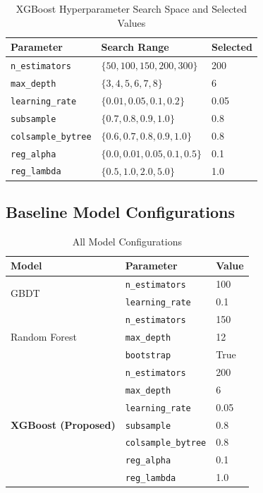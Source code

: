 \documentclass[10pt, journal, letterpaper]{IEEEtran}
\begin{document}
\begin{table}[htbp]
\caption{XGBoost Hyperparameter Search Space and Selected Values}
\label{tab:hpsearch}
\centering\small
\begin{tabular}{lll}
\toprule
\textbf{Parameter} & \textbf{Search Range} & \textbf{Selected} \\
\midrule
\texttt{n\_estimators}     & $\{50,100,150,200,300\}$     & 200  \\
\texttt{max\_depth}        & $\{3,4,5,6,7,8\}$           & 6    \\
\texttt{learning\_rate}    & $\{0.01,0.05,0.1,0.2\}$     & 0.05 \\
\texttt{subsample}         & $\{0.7,0.8,0.9,1.0\}$       & 0.8  \\
\texttt{colsample\_bytree} & $\{0.6,0.7,0.8,0.9,1.0\}$  & 0.8  \\
\texttt{reg\_alpha}        & $\{0.0,0.01,0.05,0.1,0.5\}$ & 0.1  \\
\texttt{reg\_lambda}       & $\{0.5,1.0,2.0,5.0\}$       & 1.0  \\
\bottomrule
\end{tabular}
\end{table}

\subsection{Baseline Model Configurations}

\begin{table}[htbp]
\caption{All Model Configurations}
\label{tab:hyperparams}
\centering\small
\begin{tabular}{lll}
\toprule
\textbf{Model} & \textbf{Parameter} & \textbf{Value} \\
\midrule
\multirow{2}{*}{GBDT}
  & \texttt{n\_estimators}  & 100  \\
  & \texttt{learning\_rate} & 0.1  \\
\midrule
\multirow{3}{*}{Random Forest}
  & \texttt{n\_estimators}  & 150  \\
  & \texttt{max\_depth}     & 12   \\
  & \texttt{bootstrap}      & True \\
\midrule
\multirow{7}{*}{\textbf{XGBoost (Proposed)}}
  & \texttt{n\_estimators}    & 200  \\
  & \texttt{max\_depth}       & 6    \\
  & \texttt{learning\_rate}   & 0.05 \\
  & \texttt{subsample}        & 0.8  \\
  & \texttt{colsample\_bytree} & 0.8 \\
  & \texttt{reg\_alpha}       & 0.1  \\
  & \texttt{reg\_lambda}      & 1.0  \\
\bottomrule
\end{tabular}
\end{table}
\end{document}

